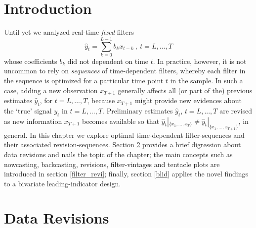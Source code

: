 \documentclass[a4paper]{book}
\begin{document}
\section{Introduction}

Until yet we analyzed real-time \emph{fixed} filters
\[\hat{y}_t=\sum_{k=0}^{L-1}b_kx_{t-k}~,~t=L,...,T\]
whose coefficients $b_k$ did not dependent on time $t$. In practice, however, it is not uncommon  to rely on \emph{sequences} of time-dependent filters, whereby each filter in the sequence is optimized for a particular time point $t$ in the sample. In such a case, adding a new observation $x_{T+1}$ generally affects all (or part of the) previous estimates $\hat{y}_t$, for $t=L,...,T$, because $x_{T+1}$ might provide new evidences about the `true' signal $y_t$ in $t=L,...,T$. Preliminary estimates $\hat{y}_t$, $t=L,...,T$ are revised as new information $x_{T+1}$ becomes available so that $\hat{y}_t|_{\{x_1,...,x_T\}} \neq \hat{y}_t|_{\{x_1,...,x_{T+1}\}}$, in general.
In this chapter we explore optimal time-dependent filter-sequences and their associated revision-sequences. Section \ref{data_revision_sec} provides a brief digression about data revisions and nails the topic of the chapter; the main concepts such as nowcasting, backcasting, revisions, filter-vintages and tentacle plots are introduced in section \ref{filter_revi}; finally, section \ref{blid} applies the novel findings to a bivariate leading-indicator design.




\section{Data Revisions}\label{data_revision_sec}
\end{document}

